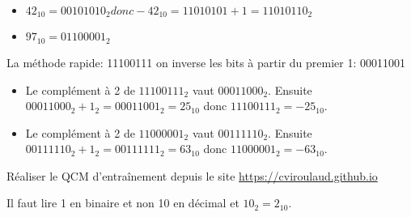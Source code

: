 \documentclass[a4paper,11pt]{article}
\begin{document}
\begin{Form}
\begin{exo}
\begin{itemize}
\item $42_{10}=00101010_2 donc -42_{10}=11010101+1=11010110_2$
\item $97_{10}=01100001_2$
\end{itemize}
\end{exo}
\begin{exo}
\begin{commentprof}
La méthode rapide: 11100111 \rightarrow on inverse les bits à partir du premier 1: 00011001 
\end{commentprof}
\begin{itemize}
\item Le complément à 2 de $11100111_2$ vaut $00011000_2$. Ensuite $00011000_2+1_2=00011001_2=25_{10}$ donc $11100111_2=-25_{10}$. 
\item Le complément à 2 de $11000001_2$ vaut $00111110_2$. Ensuite $00111110_2+1_2=00111111_2=63_{10}$ donc $11000001_2=-63_{10}$. 
\end{itemize}
\end{exo}
\begin{exo}
Réaliser le QCM d’entraînement depuis le site \url{https://cviroulaud.github.io} 
\end{exo}
\begin{exo}
Il faut lire 1 en binaire et non 10 en décimal et $10_2=2_{10}$.
\end{exo}
\end{Form}
\end{document}
